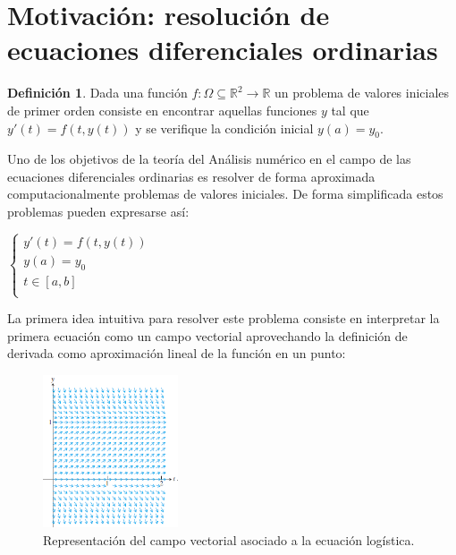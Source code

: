 \documentclass{article}
\theoremstyle{theorem-style}  %
\theoremstyle{definition}
\newtheorem{definition}{Definición}[section]
\theoremstyle{example-style}
\begin{document}
\maketitle



\newpage
\tableofcontents
\newpage


\section{Motivación: resolución de ecuaciones diferenciales ordinarias}
\begin{definition} Dada una función $f:\Omega \subseteq \mathbb R^2  \to \mathbb{R}$ un problema de valores iniciales de primer orden consiste en encontrar aquellas funciones $y$ tal que $y'(t) = f(t,y(t))$ y se verifique la condición inicial $y(a) = y_0$.  
\end{definition}

	Uno de los objetivos de la teoría del Análisis numérico en el campo de las ecuaciones diferenciales ordinarias es resolver de forma aproximada computacionalmente problemas de valores iniciales. De forma simplificada estos problemas pueden expresarse así:

\begin{center}
$\begin{cases}
y'(t) = f(t,y(t)) \\
y(a) = y_0 \\
t \in [a,b] \\
\end{cases}$
\end{center}

La primera idea intuitiva para resolver este problema consiste en interpretar la primera ecuación como un campo vectorial aprovechando la definición de derivada como aproximación lineal de la función en un punto:

\begin{figure}[h]
\centering
\includegraphics[width=4cm]{./Images/interpret-pvi.png}
\caption{Representación del campo vectorial asociado a la ecuación logística.} 
\label{fig:interpret-pvi}
\end{figure}
\end{document}
